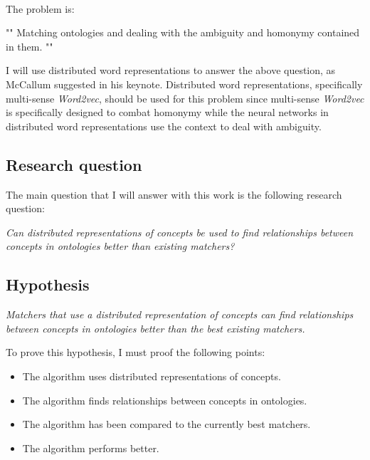 \documentclass{article}
\begin{document}
 \paragraph{}
 The problem is:
 
"" 
  Matching ontologies and dealing with the ambiguity and homonymy contained in them.
""

  I will use distributed word representations to answer the above question, as McCallum suggested in his keynote. Distributed word representations, specifically multi-sense \emph{Word2vec}, should be used for this problem since multi-sense \emph{Word2vec} is specifically designed to combat homonymy while the neural networks in distributed word representations use the context to deal with ambiguity.
  
 \subsection{Research question} \label{researchquestion}
 The main question that I will answer with this work is the following research question:
 
 \begin{center}
 \textit{
 Can distributed representations of concepts be used to find relationships between concepts in ontologies better than existing matchers?
 }
 \end{center}
 
 \subsection{Hypothesis} \label{hypotheses}
 
 \begin{center}
 \textit{Matchers that use a distributed representation of concepts can find relationships between concepts in ontologies better than the best existing matchers.}
 \end{center}

 To prove this hypothesis, I must proof the following points:
 \begin{itemize}
 \item The algorithm uses distributed representations of concepts.
 \item The algorithm finds relationships between concepts in ontologies.
 \item The algorithm has been compared to the currently best matchers.
 \item The algorithm performs better.
 \end{itemize} 
 
\end{document}
